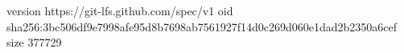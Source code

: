 version https://git-lfs.github.com/spec/v1
oid sha256:3bc506df9e7998afe95d8b7698ab7561927f14d0c269d060e1dad2b2350a6cef
size 377729
